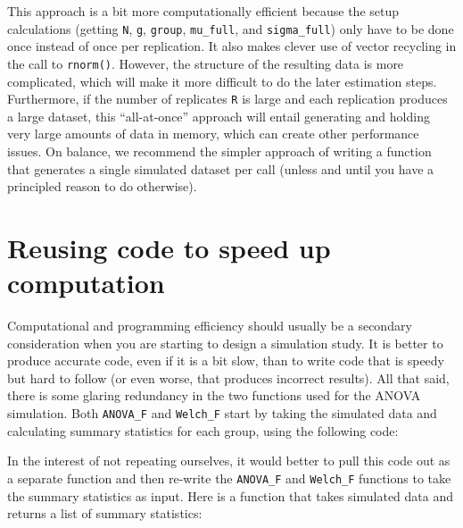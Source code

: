 \documentclass[
]{book}
\newenvironment{Shaded}{\begin{snugshade}}{\end{snugshade}}
\newcommand{\FunctionTok}[1]{\textcolor[rgb]{0.13,0.29,0.53}{\textbf{#1}}}
\newcommand{\NormalTok}[1]{#1}
\newcommand{\OtherTok}[1]{\textcolor[rgb]{0.56,0.35,0.01}{#1}}
\newcommand{\SpecialCharTok}[1]{\textcolor[rgb]{0.81,0.36,0.00}{\textbf{#1}}}
\begin{document}
This approach is a bit more computationally efficient because the setup calculations (getting \texttt{N}, \texttt{g}, \texttt{group}, \texttt{mu\_full}, and \texttt{sigma\_full}) only have to be done once instead of once per replication. It also makes clever use of vector recycling in the call to \texttt{rnorm()}. However, the structure of the resulting data is more complicated, which will make it more difficult to do the later estimation steps.
Furthermore, if the number of replicates \texttt{R} is large and each replication produces a large dataset, this ``all-at-once'' approach will entail generating and holding very large amounts of data in memory, which can create other performance issues.
On balance, we recommend the simpler approach of writing a function that generates a single simulated dataset per call (unless and until you have a principled reason to do otherwise).

\section{Reusing code to speed up computation}\label{reusing-code-to-speed-up-computation}

Computational and programming efficiency should usually be a secondary consideration when you are starting to design a simulation study.
It is better to produce accurate code, even if it is a bit slow, than to write code that is speedy but hard to follow (or even worse, that produces incorrect results).
All that said, there is some glaring redundancy in the two functions used for the ANOVA simulation.
Both \texttt{ANOVA\_F} and \texttt{Welch\_F} start by taking the simulated data and calculating summary statistics for each group, using the following code:

\begin{Shaded}
\end{Shaded}

In the interest of not repeating ourselves, it would better to pull this code out as a separate function and then re-write the \texttt{ANOVA\_F} and \texttt{Welch\_F} functions to take the summary statistics as input. Here is a function that takes simulated data and returns a list of summary statistics:
\end{document}
